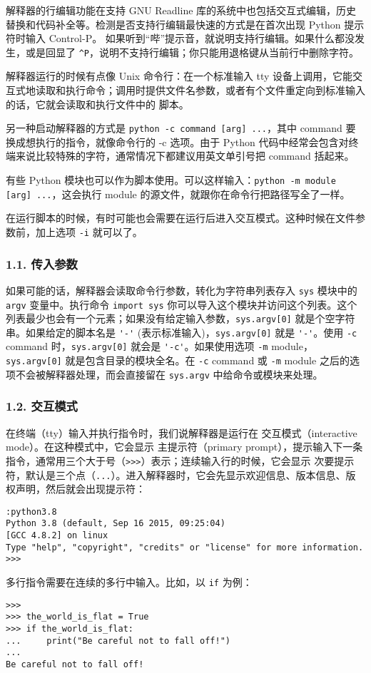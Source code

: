 解释器的行编辑功能在支持 GNU Readline 库的系统中也包括交互式编辑，历史替换和代码补全等。检测是否支持行编辑最快速的方式是在首次出现 Python 提示符时输入 Control-P。 如果听到“哔”提示音，就说明支持行编辑。如果什么都没发生，或是回显了 \verb|^P|，说明不支持行编辑；你只能用退格键从当前行中删除字符。

解释器运行的时候有点像 Unix 命令行：在一个标准输入 tty 设备上调用，它能交互式地读取和执行命令；调用时提供文件名参数，或者有个文件重定向到标准输入的话，它就会读取和执行文件中的 脚本。

另一种启动解释器的方式是 \verb|python -c command [arg] ...|，其中 command 要换成想执行的指令，就像命令行的 -c 选项。由于 Python 代码中经常会包含对终端来说比较特殊的字符，通常情况下都建议用英文单引号把 command 括起来。

有些 Python 模块也可以作为脚本使用。可以这样输入：\verb|python -m module [arg] ...|，这会执行 module 的源文件，就跟你在命令行把路径写全了一样。

在运行脚本的时候，有时可能也会需要在运行后进入交互模式。这种时候在文件参数前，加上选项 \verb|-i| 就可以了。

\subsubsection{1.1. 传入参数}
如果可能的话，解释器会读取命令行参数，转化为字符串列表存入 \verb|sys| 模块中的 \verb|argv| 变量中。执行命令 \verb|import sys| 你可以导入这个模块并访问这个列表。这个列表最少也会有一个元素；如果没有给定输入参数，\verb|sys.argv[0]| 就是个空字符串。如果给定的脚本名是 \verb|'-'| (表示标准输入)，\verb|sys.argv[0]| 就是 \verb|'-'|。使用 \verb|-c| command 时，\verb|sys.argv[0]| 就会是 \verb|'-c'|。如果使用选项 \verb|-m| module，\verb|sys.argv[0]| 就是包含目录的模块全名。在 \verb|-c| command 或 \verb|-m| module 之后的选项不会被解释器处理，而会直接留在 \verb|sys.argv| 中给命令或模块来处理。

\subsubsection{1.2. 交互模式}

在终端（tty）输入并执行指令时，我们说解释器是运行在 交互模式（interactive mode）。在这种模式中，它会显示 主提示符（primary prompt），提示输入下一条指令，通常用三个大于号（\verb|>>>|）表示；连续输入行的时候，它会显示 次要提示符，默认是三个点（\verb|...|）。进入解释器时，它会先显示欢迎信息、版本信息、版权声明，然后就会出现提示符：

\begin{lstlisting}[language=none]
:python3.8
Python 3.8 (default, Sep 16 2015, 09:25:04)
[GCC 4.8.2] on linux
Type "help", "copyright", "credits" or "license" for more information.
>>>
\end{lstlisting}
多行指令需要在连续的多行中输入。比如，以 \verb|if| 为例：
\begin{lstlisting}[language=none]
>>>
>>> the_world_is_flat = True
>>> if the_world_is_flat:
...     print("Be careful not to fall off!")
...
Be careful not to fall off!
\end{lstlisting}

